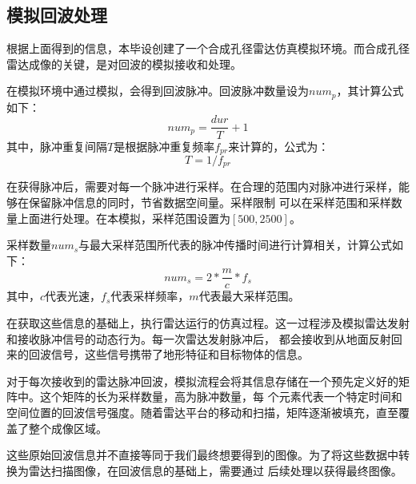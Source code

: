 \documentclass{xduugthesis}
\begin{document}
\subsection{模拟回波处理}
根据上面得到的信息，本毕设创建了一个合成孔径雷达仿真模拟环境。而合成孔径雷达成像的关键，是对回波的模拟接收和处理。\par
在模拟环境中通过模拟，会得到回波脉冲。回波脉冲数量设为$num_{p}$，其计算公式如下：
\begin{equation}num_{p} = \frac{dur}{T} + 1\end{equation}
其中，脉冲重复间隔$T$是根据脉冲重复频率$f_{pr}$来计算的，公式为：
\begin{equation}T=1/f_{pr}\end{equation}\par
在获得脉冲后，需要对每一个脉冲进行采样。在合理的范围内对脉冲进行采样，能够在保留脉冲信息的同时，节省数据空间量。采样限制
可以在采样范围和采样数量上面进行处理。在本模拟，采样范围设置为$\left[500,2500\right]$。\par
采样数量$num_{s}$与最大采样范围所代表的脉冲传播时间进行计算相关，计算公式如下：
\begin{equation} num_{s}=2*\frac{m}{c}*f_{s} \end{equation}
其中，$c$代表光速，$f_{s}$代表采样频率，$m$代表最大采样范围。\par
在获取这些信息的基础上，执行雷达运行的仿真过程。这一过程涉及模拟雷达发射和接收脉冲信号的动态行为。每一次雷达发射脉冲后，
都会接收到从地面反射回来的回波信号，这些信号携带了地形特征和目标物体的信息。\par
对于每次接收到的雷达脉冲回波，模拟流程会将其信息存储在一个预先定义好的矩阵中。这个矩阵的长为采样数量，高为脉冲数量，每
个元素代表一个特定时间和空间位置的回波信号强度。随着雷达平台的移动和扫描，矩阵逐渐被填充，直至覆盖了整个成像区域。\par
这些原始回波信息并不直接等同于我们最终想要得到的图像。为了将这些数据中转换为雷达扫描图像，在回波信息的基础上，需要通过
后续处理以获得最终图像。
\end{document}
